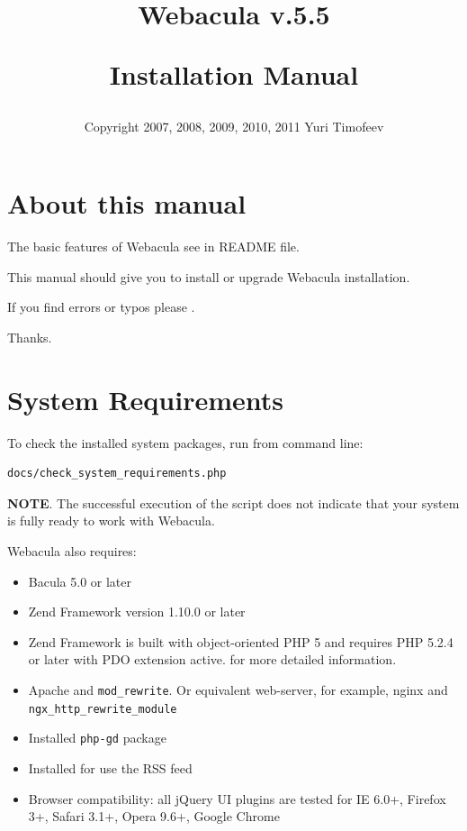 \documentclass[10pt]{article}
\title{
  \Huge{Webacula v.5.5}
  \begin{center}
   \large{Installation Manual}
  \end{center}
}
\author{
  \begin{small}
    Copyright 2007, 2008, 2009, 2010, 2011
    Yuri Timofeev \htmladdnormallink{tim4dev@gmail.com}{mailto:tim4dev@gmail.com}
  \end{small}
}
\begin{document}
\maketitle
\clearpage

\tableofcontents
\clearpage

\listoffigures
\clearpage

\section{About this manual}
\label{About}

The basic features of Webacula see in README file.

This manual should give you to install or upgrade Webacula installation.

If you find errors or typos please
.

Thanks.



\section{System Requirements}
\label{System Requirements}

To check the installed system packages, run from command line:
\begin{verbatim}docs/check_system_requirements.php\end{verbatim}

\textbf{NOTE}. The successful execution of the script does not indicate that your system is fully ready to work with Webacula.


Webacula also requires:
\begin{itemize}
  \item Bacula 5.0 or later
  \item Zend Framework version 1.10.0 or later
  \item Zend Framework is built with object-oriented PHP 5 and requires PHP 5.2.4 or later with PDO extension active.
        for more detailed information.
  \item Apache and \texttt{mod\_rewrite}. Or equivalent web-server, for example, nginx and \texttt{ngx\_http\_rewrite\_module}
  \item Installed \texttt{php-gd} package
  \item Installed  for use the RSS feed
  \item Browser compatibility: all jQuery UI plugins are tested for IE 6.0+, Firefox 3+, Safari 3.1+, Opera 9.6+, Google Chrome
\end{itemize}
\end{document}
